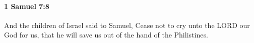 
		\paragraph{1 Samuel 7:8} %
			\label{1SAMUEL-7-8}

			And the children of Israel said to Samuel, Cease not to cry unto the LORD our God for us, that he will save us out of the hand of the Philistines.


